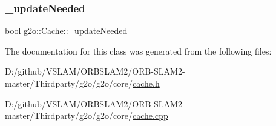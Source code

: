 \subsubsection{\texorpdfstring{\+\_\+update\+Needed}{\_updateNeeded}}
{\footnotesize\ttfamily bool g2o\+::\+Cache\+::\+\_\+update\+Needed\hspace{0.3cm}{\ttfamily [protected]}}



The documentation for this class was generated from the following files\+:\begin{DoxyCompactItemize}
\item 
D\+:/github/\+V\+S\+L\+A\+M/\+O\+R\+B\+S\+L\+A\+M2/\+O\+R\+B-\/\+S\+L\+A\+M2-\/master/\+Thirdparty/g2o/g2o/core/\mbox{\hyperlink{cache_8h}{cache.\+h}}\item 
D\+:/github/\+V\+S\+L\+A\+M/\+O\+R\+B\+S\+L\+A\+M2/\+O\+R\+B-\/\+S\+L\+A\+M2-\/master/\+Thirdparty/g2o/g2o/core/\mbox{\hyperlink{cache_8cpp}{cache.\+cpp}}\end{DoxyCompactItemize}
